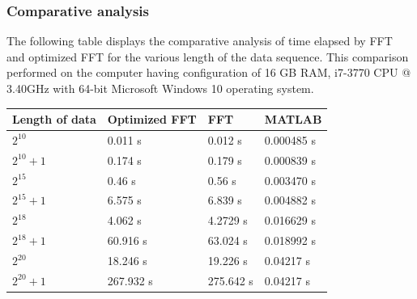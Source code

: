 \begin{refsection}
\subsubsection{Comparative analysis }
The following table displays the comparative analysis of time elapsed by FFT and optimized FFT for the various length of the data sequence. This comparison performed on the computer having configuration of 16 GB RAM, i7-3770 CPU @ 3.40GHz with 64-bit Microsoft Windows 10 operating system.
\begin{center}
	\begin{tabular}{ |p{4cm}||p{3cm}|p{3cm}|p{3cm}|   }
		\hline
		\centering \textbf{Length of data} & \textbf{Optimized FFT}& \textbf{FFT}&\textbf{MATLAB}\\
		\hline
		\hline
		\centering \textbf{$2^{10}$}   & 0.011 s  & 0.012 s & 0.000485 s\\
		\hline
		\centering \textbf{$2^{10}+1$} & 0.174 s  & 0.179 s & 0.000839 s\\
		\hline
		\centering \textbf{$2^{15}$}   & 0.46 s   & 0.56 s  & 0.003470 s\\
		\hline
		\centering \textbf{$2^{15}+1$} & 6.575 s  & 6.839 s & 0.004882 s\\
		\hline
		\centering \textbf{$2^{18}$}   & 4.062 s  & 4.2729 s& 0.016629 s \\
		\hline
		\centering \textbf{$2^{18}+1$} & 60.916 s & 63.024 s& 0.018992 s\\
		\hline
		\centering \textbf{$2^{20}$}   & 18.246 s & 19.226 s&  0.04217 s\\
		\hline
		\centering \textbf{$2^{20}+1$} & 267.932 s & 275.642 s & 0.04217 s \\
		\hline
	\end{tabular}
\end{center}




\clearpage
\printbibliography[heading=subbibliography]
\end{refsection}
\cleardoublepage


